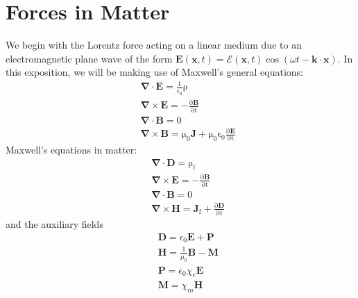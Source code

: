 \section{Forces in Matter}
We begin with the Lorentz force acting on a linear medium due to an electromagnetic plane wave of the form $\mathbf{E}(\mathbf{x},t)=\mathbf{\mathcal{E}}(\mathbf{x},t)\cos{(\omega t -\mathbf{k\cdot x})}$. In this exposition, we will be making use of Maxwell's general equations:
\begin{eqnarray}
&&\mathrm{\mathbf{\nabla}\cdot\mathbf{E}=\frac{1}{\epsilon_0}\rho} \\
&&\mathrm{\mathbf{\nabla}\times\mathbf{E}=-\frac{\partial \mathbf{B}}{\partial t}} \\
&&\mathrm{\mathbf{\nabla}\cdot\mathbf{B}=0} \\
&&\mathrm{\mathbf{\nabla}\times\mathbf{B}=\mu_0\mathbf{J}+\mu_0 \epsilon_0\frac{\partial \mathbf{E}}{\partial t}} 
\label{maxwellgeneral}
\end{eqnarray}
Maxwell's equations in matter:
\begin{eqnarray}
&&\mathrm{\mathbf{\nabla}\cdot\mathbf{D}=\rho_f} \\
&&\mathrm{\mathbf{\nabla}\times\mathbf{E}=-\frac{\partial \mathbf{B}}{\partial t}} \\
&&\mathrm{\mathbf{\nabla}\cdot\mathbf{B}=0} \\
&&\mathrm{\mathbf{\nabla}\times\mathbf{H}=\mathbf{J}_f+\frac{\partial  \mathbf{D}}{\partial t}}
\label{maxwellfree}
\end{eqnarray}
and the auxiliary fields
\begin{eqnarray}
&&\mathbf{D}= \epsilon_0\mathbf{E}+\mathbf{P} \\
&&\mathbf{H}= \frac{1}{\mu_0}\mathbf{B}-\mathbf{M} \\
&&\mathbf{P}= \epsilon_0\chi_e\mathbf{E} \\
&&\mathbf{M}= \chi_m\mathbf{H}
\label{auxiliary}
\end{eqnarray}

